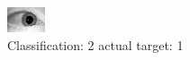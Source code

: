 \begin{figure}[h!]
\begin{center}
\includegraphics[width=0.60\columnwidth]{figures/ID1423_class_2_target_1.png}
\end{center}
\caption{ Classification: 2 actual target: 1}
\label{fig:ID1423_class_2_target_1}
\end{figure}
